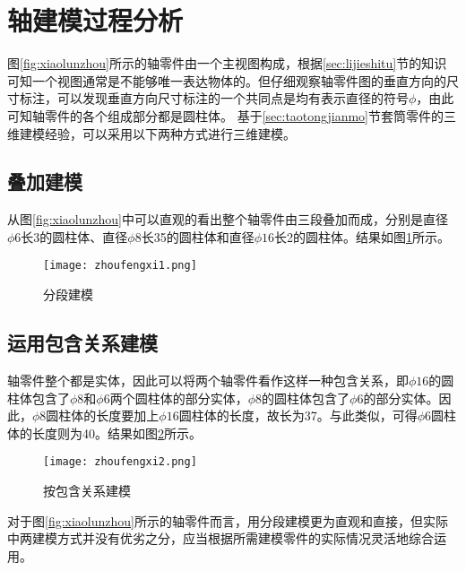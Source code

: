 \section{轴建模过程分析}\label{sec:zhoufengxi}
图\ref{fig:xiaolunzhou}所示的轴零件由一个主视图构成，根据\ref{sec:lijieshitu}节的知识可知一个视图通常是不能够唯一表达物体的。但仔细观察轴零件图的垂直方向的尺寸标注，可以发现垂直方向尺寸标注的一个共同点是均有表示直径的符号$\phi$，由此可知轴零件的各个组成部分都是圆柱体。 基于\ref{sec:taotongjianmo}节套筒零件的三维建模经验，可以采用以下两种方式进行三维建模。

\subsection{叠加建模}
从图\ref{fig:xiaolunzhou}中可以直观的看出整个轴零件由三段叠加而成，分别是直径$\phi 6$长3的圆柱体、直径$\phi 8$长35的圆柱体和直径$\phi 16$长2的圆柱体。结果如图\ref{fig:zhoufengxi1}所示。
\begin{figure}[htbp]
\centering
\texttt{[image: zhoufengxi1.png]}
\caption{分段建模}\label{fig:zhoufengxi1}
\end{figure}
\subsection{运用包含关系建模}
轴零件整个都是实体，因此可以将两个轴零件看作这样一种包含关系，即$\phi 16$的圆柱体包含了$\phi 8$和$\phi 6$两个圆柱体的部分实体，$\phi 8$的圆柱体包含了$\phi 6$的部分实体。因此，$\phi 8$圆柱体的长度要加上$\phi 16$圆柱体的长度，故长为37。与此类似，可得$\phi 6$圆柱体的长度则为40。结果如图\ref{fig:zhoufengxi2}所示。
\begin{figure}[htbp]
\centering
\texttt{[image: zhoufengxi2.png]}
\caption{按包含关系建模}\label{fig:zhoufengxi2}
\end{figure}

对于图\ref{fig:xiaolunzhou}所示的轴零件而言，用分段建模更为直观和直接，但实际中两建模方式并没有优劣之分，应当根据所需建模零件的实际情况灵活地综合运用。
\endinput